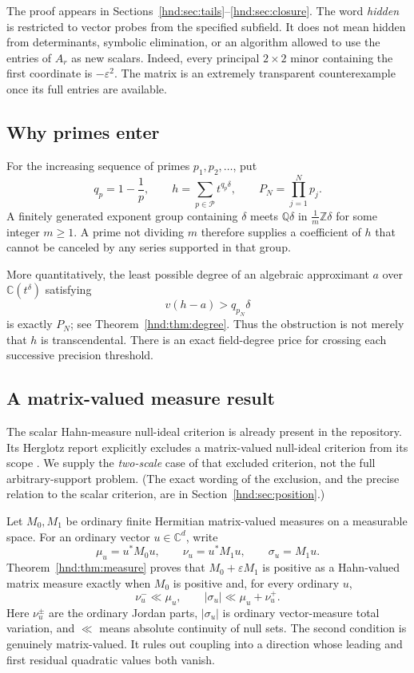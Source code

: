 \documentclass[11pt,oneside]{article}
\theoremstyle{definition}
\theoremstyle{remark}
\newcommand{\C}{\mathbb C}
\newcommand{\Q}{\mathbb Q}
\newcommand{\Z}{\mathbb Z}
\newcommand{\eps}{\varepsilon}
\newcommand{\primes}{\mathcal P}
\begin{document}
The proof appears in Sections~\ref{hnd:sec:tails}--\ref{hnd:sec:closure}.
The word \emph{hidden} is restricted to vector probes from the specified
subfield. It does not mean hidden from determinants, symbolic
elimination, or an algorithm allowed to use the entries of $A_r$ as new
scalars. Indeed, every principal $2\times2$ minor containing the first
coordinate is $-\eps^2$. The matrix is an extremely transparent
counterexample once its full entries are available.

\subsection{Why primes enter}

For the increasing sequence of primes $p_1,p_2,\ldots$, put
\begin{equation}\label{hnd:eq:alltail-intro}
 q_p=1-\frac1p,
 \qquad h=\sum_{p\in\primes}t^{q_p\delta},
 \qquad P_N=\prod_{j=1}^N p_j.
\end{equation}
A finitely generated exponent group containing $\delta$ meets
$\Q\delta$ in $\frac1m\Z\delta$ for some integer $m\ge1$.
A prime not dividing $m$ therefore supplies a coefficient of $h$ that
cannot be canceled by any series supported in that group.

More quantitatively, the least possible degree of an algebraic
approximant $a$ over $\C(t^\delta)$ satisfying
\[
 v(h-a)>q_{p_N}\delta
\]
is exactly $P_N$; see Theorem~\ref{hnd:thm:degree}. Thus the obstruction is
not merely that $h$ is transcendental. There is an exact field-degree
price for crossing each successive precision threshold.

\subsection{A matrix-valued measure result}

The scalar Hahn-measure null-ideal criterion is already present in the
repository. Its Herglotz report explicitly excludes a matrix-valued
null-ideal criterion from its scope \cite{repo-herglotz}. We supply the
\emph{two-scale} case of that excluded criterion, not the full
arbitrary-support problem. (The exact wording of the exclusion, and the
precise relation to the scalar criterion, are in
Section~\ref{hnd:sec:position}.)

Let $M_0,M_1$ be ordinary finite Hermitian matrix-valued measures on a
measurable space. For an ordinary vector $u\in\C^d$, write
\[
 \mu_u=u^*M_0u,\qquad \nu_u=u^*M_1u,\qquad \sigma_u=M_1u.
\]
Theorem~\ref{hnd:thm:measure} proves that $M_0+\eps M_1$ is positive as a
Hahn-valued matrix measure exactly when $M_0$ is positive and, for every
ordinary $u$,
\begin{equation}\label{hnd:eq:measure-preview}
 \nu_u^-\ll\mu_u,
 \qquad
 |\sigma_u|\ll\mu_u+\nu_u^+.
\end{equation}
Here $\nu_u^\pm$ are the ordinary Jordan parts, $|\sigma_u|$ is ordinary
vector-measure total variation, and $\ll$ means absolute continuity of
null sets. The second condition is genuinely matrix-valued. It rules out
coupling into a direction whose leading and first residual quadratic
values both vanish.
\end{document}
